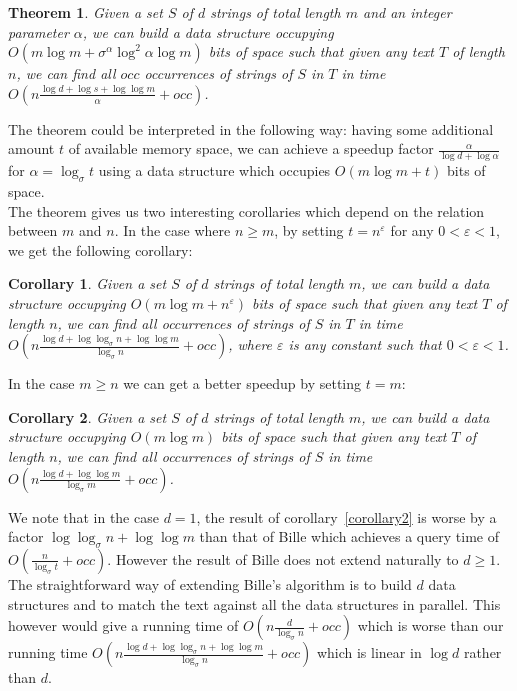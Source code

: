 \documentclass{article}
\newcommand{\?}{\mskip1.5mu}
\newtheorem{theorem}{Theorem}
\newtheorem{corollary}{Corollary}
\renewcommand{\epsilon}{\varepsilon}
\begin{document}
\begin{theorem}
\label{theorem2}
Given a set $S$ of $d$ strings of total length $m$ and an integer parameter $\alpha$, we can build a data structure occupying $O(m\log m+\sigma^\alpha\log^2\alpha\log m)$ bits of space such that given any text $T$ of length $n$, we can find all $occ$ occurrences of strings of $S$ in $T$ in time $O(n\frac{\log d+\log s+\log\log m}{\alpha}+occ)$.
\end{theorem}
The theorem could be interpreted in the following way: having some additional amount $t$ of available memory space, we can achieve a speedup factor $\frac{\alpha}{\log d+\log \alpha}$ for $\alpha=\log_\sigma t$ using a data structure which occupies $O(m\log m+t)$ bits of space.  
\\ The theorem gives us two interesting corollaries which depend on the relation between $m$ and $n$. In the case where $n\geq m$, by setting $t=n^{\epsilon}$ for any $0<\epsilon<1$, we get the following corollary: 

\begin{corollary}
\label{corollary4}
Given a set $S$ of $d$ strings of total length $m$, we can build a data structure occupying $O(m\log m+n^{\epsilon})$ bits of space such that given any text $T$ of length $n$, we can find all occurrences of strings of $S$ in $T$ in time $O(n\frac{\log d+\log\log_\sigma n+\log\log m}{\log_\sigma n}+occ)$, where $\epsilon$ is any constant such that $0<\epsilon<1$.
\end{corollary}


In the case $m\geq n$ we can get a better speedup by setting $t=m$:
\begin{corollary}
\label{corollary5}
Given a set $S$ of $d$ strings of total length $m$, we can build a data structure occupying $O(m\log m)$ bits of space such that given any text $T$ of length $n$, we can find all occurrences of strings of $S$ in time $O(n\frac{\log d+\log\log m}{\log_\sigma m}+occ)$.
\end{corollary}
We note that in the case $d=1$, the result of corollary~\ref{corollary2} is worse by a factor $\log\log_\sigma n+\log\log m$ than that of Bille which achieves a query time of $O(\frac{n}{\log_\sigma t}+occ)$. However the result of Bille does not extend naturally to $d\geq 1$. The straightforward way of extending Bille's algorithm is to build $d$ data structures and to match the text against all the data structures in parallel. This however would give a running time of $O(n\frac{d}{\log_\sigma n}+occ)$ which is worse than our running time $O(n\frac{\log d+\log\log_\sigma n+\log\log m}{\log_\sigma n}+occ)$ which is linear in $\log d$ rather than $d$.
\end{document}
